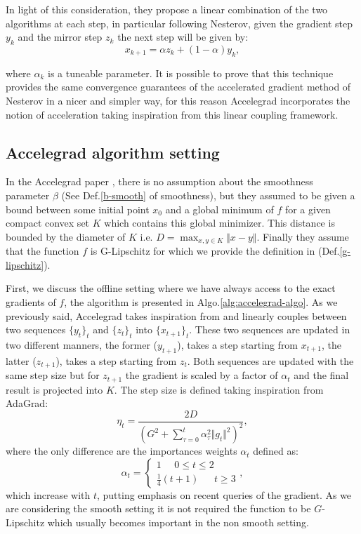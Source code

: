 \documentclass[12pt]{article}
\theoremstyle{definition}
\begin{document}
In light of this consideration, they propose a linear combination of the two algorithms at each step, in particular following Nesterov, given the gradient step $y_k$ and the mirror step $z_k$ the next step will be given by:
\begin{equation}
  x_{k+1} = \alpha z_k + (1-\alpha) y_k,
\end{equation}

where $\alpha_k$ is a tuneable parameter.
It is possible to prove that this technique provides the same convergence guarantees of the accelerated gradient method of Nesterov in a nicer and simpler way, for this reason Accelegrad incorporates the notion of acceleration taking inspiration from this linear coupling framework.
  
\subsection{Accelegrad algorithm setting}

In the Accelegrad paper \cite{accelegrad}, there is no assumption about the smoothness parameter $\beta$ (See Def.\ref{b-smooth} of smoothness), but they assumed to be given a bound between some initial point $x_0$ and a global minimum of $f$ for a given compact convex set $K$ which contains this global minimizer. This distance is bounded by the diameter of $K$ i.e. $D = \max_{x,y \in K} \Vert x-y \Vert $. Finally they assume that the function $f$ is G-Lipschitz for which we provide the definition in (Def.\ref{g-lipschitz}).

First, we discuss the offline setting where we have always access to the exact gradients of $f$, the algorithm is presented in Algo.\ref{alg:accelegrad-algo}. As we previously said, Accelegrad takes inspiration from \cite{linearcup} and linearly couples between two sequences $\{y_t\}_t$ and $\{z_t\}_t$ into $\{x_{t+1}\}_t$. These two sequences are updated in two different manners, the former ($y_{t+1}$), takes a step starting from $x_{t+1}$, the latter ($z_{t+1}$), takes a step starting from $z_t$. Both sequences are updated with the same step size but for $z_{t+1}$ the gradient is scaled by a factor of $\alpha_t$ and the final result is projected into $K$. The step size is defined taking inspiration from AdaGrad:
\begin{equation}
  \eta_t = \frac{2D}{(G^2 + \sum_{\tau = 0}^t \alpha_{\tau}^2 \Vert g_t \Vert^2)^2},
\label{learning-1}
\end{equation}
where the only difference are the importances weights $\alpha_t$ defined as:
\begin{equation}
  \alpha_t = \begin{cases}
				1 \ \ \ \ \ \ 0 \leq t \leq 2\\
				\frac{1}{4}(t+1) \ \ \ \ \ \ \ t \geqslant 3
			 \end{cases},
\label{alpha}
\end{equation}
which increase with $t$, putting emphasis on recent queries of the gradient. As we are considering the smooth setting it is not required the function to be $G$-Lipschitz which usually becomes important in the non smooth setting.
\end{document}
